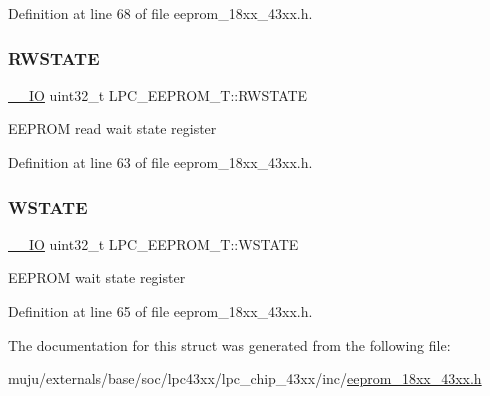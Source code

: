 Definition at line 68 of file eeprom\+\_\+18xx\+\_\+43xx.\+h.

\mbox{\label{struct_l_p_c___e_e_p_r_o_m___t_a67ce6bf0454c6a840f9f7879c5320195}} 
\subsubsection{\texorpdfstring{R\+W\+S\+T\+A\+TE}{RWSTATE}}
{\footnotesize\ttfamily \hyperlink{core__sc300_8h_aec43007d9998a0a0e01faede4133d6be}{\+\_\+\+\_\+\+IO} uint32\+\_\+t L\+P\+C\+\_\+\+E\+E\+P\+R\+O\+M\+\_\+\+T\+::\+R\+W\+S\+T\+A\+TE}

E\+E\+P\+R\+OM read wait state register 

Definition at line 63 of file eeprom\+\_\+18xx\+\_\+43xx.\+h.

\mbox{\label{struct_l_p_c___e_e_p_r_o_m___t_a14d53f1ccce20c3cd1a0714de7d9c907}} 
\subsubsection{\texorpdfstring{W\+S\+T\+A\+TE}{WSTATE}}
{\footnotesize\ttfamily \hyperlink{core__sc300_8h_aec43007d9998a0a0e01faede4133d6be}{\+\_\+\+\_\+\+IO} uint32\+\_\+t L\+P\+C\+\_\+\+E\+E\+P\+R\+O\+M\+\_\+\+T\+::\+W\+S\+T\+A\+TE}

E\+E\+P\+R\+OM wait state register 

Definition at line 65 of file eeprom\+\_\+18xx\+\_\+43xx.\+h.



The documentation for this struct was generated from the following file\+:\begin{DoxyCompactItemize}
\item 
muju/externals/base/soc/lpc43xx/lpc\+\_\+chip\+\_\+43xx/inc/\hyperlink{eeprom__18xx__43xx_8h}{eeprom\+\_\+18xx\+\_\+43xx.\+h}\end{DoxyCompactItemize}
